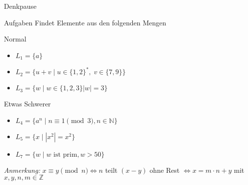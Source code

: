 {
\begin{frame}[fragile]{Denkpause}
    \footnotesize
        \begin{alertblock}{Aufgaben}
            Findet Elemente aus den folgenden Mengen
        \end{alertblock}
        \begin{block}{Normal}
            \begin{itemize}
                \item $L_1 = \{a\}$
                \item $L_2 = \{u+v \mid u\in\{1,2\}^\ast,\;v\in\{7,9\}\}$
                \item $L_3 = \{w \mid w \in\{1,2,3\} |w| = 3\}$
            \end{itemize}
        \end{block}
        \begin{block}{Etwas Schwerer}
            \begin{itemize}
                \item $L_4 = \{a^n \mid n \equiv 1 \pmod 3, n\in\mathbb{N}\}$
                \item $L_5 = \{x \mid |x^2| = x^2\}$
                \item $L_7 = \{w \mid w \text{ ist prim}, w > 50\}$
            \end{itemize}
        \end{block}
        \emph{Anmerkung:} $x \equiv y \pmod n \iff n$ teilt $(x-y)$ ohne Rest $\iff x = m \cdot n + y$ mit $x,y,n,m \in \mathbb{Z}$
\end{frame}
}

